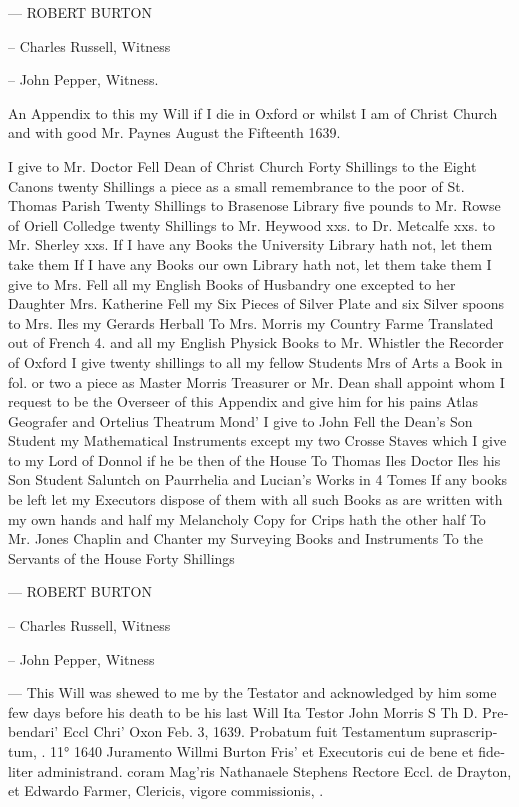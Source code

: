 \begin{displayquote}
{--- ROBERT BURTON

-- Charles Russell, Witness

-- John Pepper, Witness.

An Appendix to this my Will if I die in Oxford or whilst I am of Christ Church and with good Mr. Paynes August the Fifteenth 1639.

I give to Mr. Doctor Fell Dean of Christ Church Forty Shillings to the Eight Canons twenty Shillings a piece as a small remembrance to the poor of St. Thomas Parish Twenty Shillings to Brasenose Library five pounds to Mr. Rowse of Oriell Colledge twenty Shillings to Mr. Heywood xxs. to Dr. Metcalfe xxs. to Mr. Sherley xxs. If I have any Books the University Library hath not, let them take them If I have any Books our own Library hath not, let them take them I give to Mrs. Fell all my English Books of Husbandry one excepted to her Daughter Mrs. Katherine Fell my Six Pieces of Silver Plate and six Silver spoons to Mrs. Iles my Gerards Herball To Mrs. Morris my Country Farme Translated out of French 4. and all my English Physick Books to Mr. Whistler the Recorder of Oxford I give twenty shillings to all my fellow Students Mrs of Arts a Book in fol. or two a piece as Master Morris Treasurer or Mr. Dean shall appoint whom I request to be the Overseer of this Appendix and give him for his pains Atlas Geografer and Ortelius Theatrum Mond' I give to John Fell the Dean's Son Student my Mathematical Instruments except my two Crosse Staves which I give to my Lord of Donnol if he be then of the House To Thomas Iles Doctor Iles his Son Student Saluntch on Paurrhelia and Lucian's Works in 4 Tomes If any books be left let my Executors dispose of them with all such Books as are written with my own hands and half my Melancholy Copy for Crips hath the other half To Mr. Jones Chaplin and Chanter my Surveying Books and Instruments To the Servants of the House Forty Shillings

--- ROBERT BURTON

-- Charles Russell, Witness

-- John Pepper, Witness

  --- This Will was shewed to me by the Testator and acknowledged by him some few days before his death to be his last Will \textlatin{Ita Testor John Morris S Th D. Prebendari' Eccl Chri' Oxon Feb. 3, 1639. Probatum fuit Testamentum suprascriptum, \etc. 11° 1640 Juramento Willmi Burton Fris' et Executoris cui \etc{} de bene et fideliter administrand. \etc{} coram Mag'ris Nathanaele Stephens Rectore Eccl. de Drayton, et Edwardo Farmer, Clericis, vigore commissionis, \etc.}
}
\end{displayquote}
